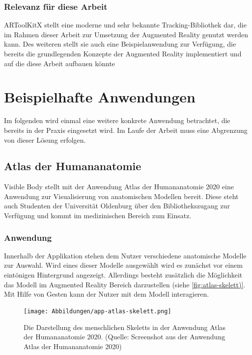 \subsubsection{Relevanz für diese Arbeit}
ARToolKitX stellt eine moderne und sehr bekannte Tracking-Bibliothek dar, die im Rahmen dieser Arbeit zur Umsetzung der Augmented Reality genutzt werden kann. Des weiteren stellt sie auch eine Beispielanwendung zur Verfügung, die bereits die grundlegenden Konzepte der Augmented Reality implementiert und auf die diese Arbeit aufbauen könnte


\section{Beispielhafte Anwendungen}
Im folgenden wird einmal eine weitere konkrete Anwendung betrachtet, die bereits in der Praxis eingesetzt wird. Im Laufe der Arbeit muss eine Abgrenzung von dieser Lösung erfolgen.

\subsection{Atlas der Humananatomie}\label{sec:atlas-humananatomie}
Visible Body stellt mit der Anwendung \glqq Atlas der Humananatomie 2020\grqq{} eine Anwendung zur Visualisierung von anatomischen Modellen bereit.  Diese steht auch Studenten der Universität Oldenburg über den Bibliothekszugang zur Verfügung und kommt im medizinischen Bereich zum Einsatz. \\
\subsubsection{Anwendung}
Innerhalb der Applikation stehen dem Nutzer verschiedene anatomische Modelle zur Auswahl. Wird eines dieser Modelle ausgewählt wird es zunächst vor einem eintönigen Hintergrund angezeigt. Allerdings besteht zusätzlich die Möglichkeit das Modell im Augmented Reality Bereich darzustellen (siehe \ref{fig:atlas-skelett)}. \\
Mit Hilfe von Gesten kann der Nutzer mit dem Modell interagieren.
\begin{figure}[h!]
\centering
\texttt{[image: Abbildungen/app-atlas-skelett.png]}
\caption[Atlas der Humananatomie]{Die Darstellung des menschlichen Skeletts in der Anwendung \glqq Atlas der Humananatomie 2020\grqq . (Quelle: Screenshot aus der Anwendung \glqq Atlas der Humananatomie 2020\grqq )}
\label{fig:atlas-skelett}
\end{figure}
